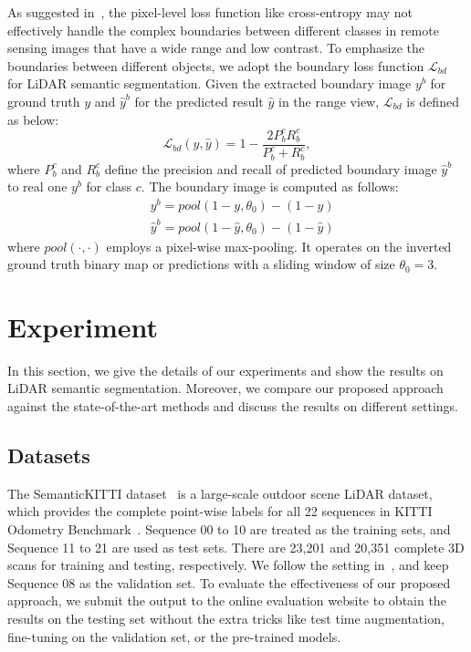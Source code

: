 \documentclass[letterpaper, 10 pt, journal, twoside]{ieeetran}
\begin{document}
As suggested in~\cite{bokhovkin2019boundary}, the pixel-level loss function like cross-entropy may not effectively handle the complex boundaries between different classes in remote sensing images that have a wide range and low contrast. To emphasize the boundaries between different objects, we adopt the boundary loss function ${\mathcal{L}}_{bd}$~\cite{bokhovkin2019boundary} for LiDAR semantic segmentation. Given the extracted boundary image $y^{b}$ for ground truth $y$ and $\hat{y}^{b}$ for the predicted result $\hat{y}$ in the range view, ${\mathcal{L}}_{bd}$ is defined as below:
\begin{equation}
\mathcal{L}_{bd}(y, \hat{y})=1-\frac{2 P_b^{c} R_b^{c}}{P_b^{c}+R_b^{c}},
\end{equation}
where $P_b^c$ and $R_b^c$ define the precision and recall of predicted boundary image $\hat{y}^{b}$ to real one $y^{b}$ for class $c$. The boundary image is computed as follows:
\begin{equation}
\begin{aligned}
&y^{b}=pool\left(1-y, \theta_{0}\right)-\left(1-y\right) \\
&\hat{y}^{b}=pool\left(1-\hat{y}, \theta_{0}\right)-\left(1-\hat{y}\right)
\end{aligned}
\end{equation}
where $pool(\cdot, \cdot)$ employs a pixel-wise max-pooling. It operates on the inverted ground truth binary map or predictions with a sliding window of size $\theta_{0}=3$.



\section{Experiment}
\label{sec:exp}
In this section, we give the details of our experiments and show the results on LiDAR semantic segmentation. Moreover, we compare our proposed approach against the state-of-the-art methods and discuss the results on different settings. 
\subsection{Datasets}
The SemanticKITTI dataset~\cite{behley2019semantickitti} is a large-scale outdoor scene LiDAR dataset, which provides the complete point-wise labels for all 22 sequences in KITTI Odometry Benchmark~\cite{geiger2013vision}. Sequence 00 to 10 are treated as the training sets, and Sequence 11 to 21 are used as test sets. There are 23,201 and 20,351 complete 3D scans for training and testing, respectively. We follow the setting in~\cite{behley2019semantickitti}, and keep Sequence 08 as the validation set. To evaluate the effectiveness of our proposed approach, we submit the output to the online evaluation website to obtain the results on the testing set without the extra tricks like test time augmentation, fine-tuning on the validation set, or the pre-trained models.
\end{document}
